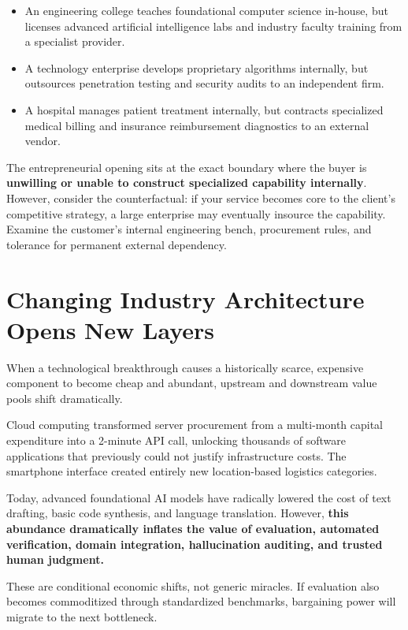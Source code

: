 \begin{itemize}[leftmargin=12pt,itemsep=2pt,topsep=1pt]
  \item An engineering college teaches foundational computer science in-house, but licenses advanced artificial intelligence labs and industry faculty training from a specialist provider.
  \item A technology enterprise develops proprietary algorithms internally, but outsources penetration testing and security audits to an independent firm.
  \item A hospital manages patient treatment internally, but contracts specialized medical billing and insurance reimbursement diagnostics to an external vendor.
\end{itemize}

The entrepreneurial opening sits at the exact boundary where the buyer is \textbf{unwilling or unable to construct specialized capability internally}. However, consider the counterfactual: if your service becomes core to the client's competitive strategy, a large enterprise may eventually insource the capability. Examine the customer's internal engineering bench, procurement rules, and tolerance for permanent external dependency.

\section{Changing Industry Architecture Opens New Layers}

When a technological breakthrough causes a historically scarce, expensive component to become cheap and abundant, upstream and downstream value pools shift dramatically.

Cloud computing transformed server procurement from a multi-month capital expenditure into a 2-minute API call, unlocking thousands of software applications that previously could not justify infrastructure costs. The smartphone interface created entirely new location-based logistics categories.

Today, advanced foundational AI models have radically lowered the cost of text drafting, basic code synthesis, and language translation. However, \textbf{this abundance dramatically inflates the value of evaluation, automated verification, domain integration, hallucination auditing, and trusted human judgment.}

These are conditional economic shifts, not generic miracles. If evaluation also becomes commoditized through standardized benchmarks, bargaining power will migrate to the next bottleneck.


